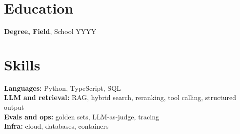 \documentclass[11pt]{article}
\begin{document}
\section{Education}
\textbf{Degree, Field}, School \hfill YYYY

\section{Skills}
\textbf{Languages:} Python, TypeScript, SQL\\
\textbf{LLM and retrieval:} RAG, hybrid search, reranking, tool calling, structured output\\
\textbf{Evals and ops:} golden sets, LLM-as-judge, tracing\\
\textbf{Infra:} cloud, databases, containers
\end{document}
